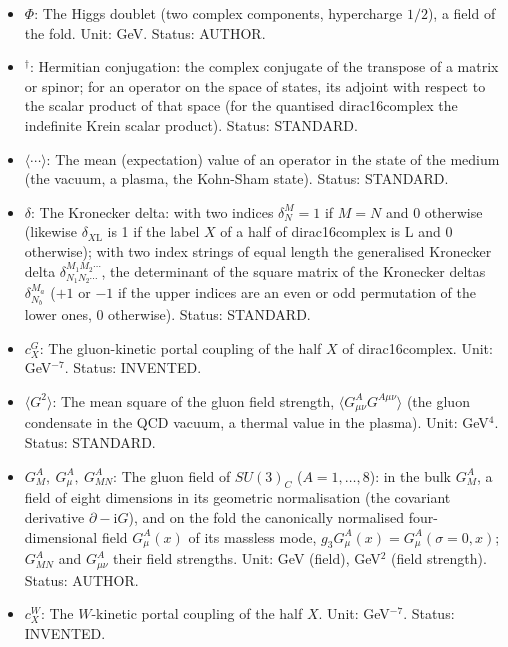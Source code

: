 \documentclass[
  10pt,
]{article}
\begin{document}
\begin{itemize}
  \(c_\Phi\): The Higgs-portal coupling of the left-handed half of
  dirac16complex (the right-handed half has none). Unit: GeV\(^{-5}\).
  Status: INVENTED.
\item
  \(\Phi\): The Higgs doublet (two complex components, hypercharge
  \(1/2\)), a field of the fold. Unit: GeV. Status: AUTHOR.
\item
  \({}^\dagger\): Hermitian conjugation: the complex conjugate of the
  transpose of a matrix or spinor; for an operator on the space of
  states, its adjoint with respect to the scalar product of that space
  (for the quantised dirac16complex the indefinite Krein scalar
  product). Status: STANDARD.
\item
  \(\langle\cdots\rangle\): The mean (expectation) value of an operator
  in the state of the medium (the vacuum, a plasma, the Kohn-Sham
  state). Status: STANDARD.
\item
  \(\delta\): The Kronecker delta: with two indices \(\delta^M_N = 1\)
  if \(M = N\) and 0 otherwise (likewise \(\delta_{X\mathrm{L}}\) is 1
  if the label \(X\) of a half of dirac16complex is L and 0 otherwise);
  with two index strings of equal length the generalised Kronecker delta
  \(\delta^{M_1M_2\cdots}_{N_1N_2\cdots}\), the determinant of the
  square matrix of the Kronecker deltas \(\delta^{M_a}_{N_b}\) (\(+1\)
  or \(-1\) if the upper indices are an even or odd permutation of the
  lower ones, 0 otherwise). Status: STANDARD.
\item
  \(c^{G}_X\): The gluon-kinetic portal coupling of the half \(X\) of
  dirac16complex. Unit: GeV\(^{-7}\). Status: INVENTED.
\item
  \(\langle G^2\rangle\): The mean square of the gluon field strength,
  \(\langle G^A_{\mu\nu}G^{A\mu\nu}\rangle\) (the gluon condensate in
  the QCD vacuum, a thermal value in the plasma). Unit: GeV\(^4\).
  Status: STANDARD.
\item
  \(G^A_M,\ G^A_\mu,\ G^A_{MN}\): The gluon field of \(SU(3)_C\)
  (\(A = 1, \dots, 8\)): in the bulk \(G^A_M\), a field of eight
  dimensions in its geometric normalisation (the covariant derivative
  \(\partial - \mathrm{i}G\)), and on the fold the canonically
  normalised four-dimensional field \(G^A_\mu(x)\) of its massless mode,
  \(g_3G^A_\mu(x) = G^A_\mu(\sigma = 0, x)\); \(G^A_{MN}\) and
  \(G^A_{\mu\nu}\) their field strengths. Unit: GeV (field), GeV\(^2\)
  (field strength). Status: AUTHOR.
\item
  \(c^{W}_X\): The \(W\)-kinetic portal coupling of the half \(X\).
  Unit: GeV\(^{-7}\). Status: INVENTED.

\end{itemize}
\end{document}
